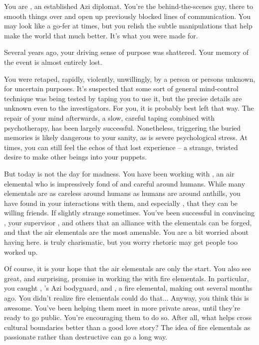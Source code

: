 \documentclass[char]{elementals}
\begin{document}
\name{\cDiplomat{}}

You are \cDiplomat{\intro}, an established Azi diplomat.  You're the behind-the-scenes guy, there to smooth things over and open up previously blocked lines of communication.  You may look like a go-fer at times, but you relish the subtle manipulations that help make the world that much better.  It's what you were made for.

Several years ago, your driving sense of purpose was shattered.  Your memory of the event is almost entirely lost.

You were retaped, rapidly, violently, unwillingly, by a person or persons unknown, for uncertain purposes.  It's suspected that some sort of general mind-control technique was being tested by taping you to use it, but the precise details are unknown even to the investigators.  For you, it is probably best left that way.  The repair of your mind afterwards, a slow, careful taping combined with psychotherapy, has been largely successful.  Nonetheless, triggering the buried memories is likely dangerous to your sanity, as is severe psychological stress.  At times, you can still feel the echos of that lost experience -- a strange, twisted desire to make other beings into your puppets.

But today is not the day for madness.  You have been working with \cNaturalist{}, an air elemental who is impressively fond of and careful around humans.  While many elementals are as careless around humans as humans are around anthills, you have found in your interactions with them, and especially \cNaturalist{}, that they can be willing friends.  If slightly strange sometimes.  You've been successful in convincing \cLeader{}, your supervisor \cAvatar{}, and others that an alliance with the elementals can be forged, and that the air elementals are the most amenable.  You are a bit worried about having \cDema{} here.  \cDema{\They} is truly charismatic, but you worry \cDema{\their} rhetoric may get people too worked up.

Of course, it is your hope that the air elementals are only the start.  You also see great, and surprising, promise in working the with fire elementals.  In particular, you caught \cRomeo{}, \cLeader{}'s Azi bodyguard, and \cJuliet{}, a fire elemental, making out several months ago.  You didn't realize fire elementals could do that...  Anyway, you think this is awesome.  You've been helping them meet in more private areas, until they're ready to go public.  You're encouraging them to do so.  After all, what helps cross cultural boundaries better than a good love story?  The idea of fire elementals as passionate rather than destructive can go a long way.
\end{document}
